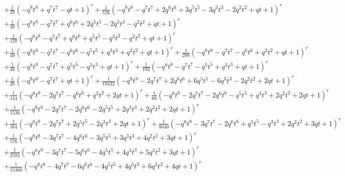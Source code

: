 \documentclass[11pt,english]{amsart}
\numberwithin{equation}{section}
\numberwithin{figure}{section}
\theoremstyle{plain}
\theoremstyle{plain}
\theoremstyle{definition}
\theoremstyle{remark}
\begin{document}
{\begin{align*}
& + \frac{1}{28}  {\left(-q^{8} t^{8} + q^{7} t^{7} - q t + 1\right)}^{r} + \frac{1}{576}  {\left(-q^{8} t^{8} - q^{7} t^{7} + 2  q^{6} t^{6} + 3  q^{5} t^{5} - 3  q^{3} t^{3} - 2  q^{2} t^{2} + q t + 1\right)}^{r} \\
& + \frac{1}{48}  {\left(-q^{8} t^{8} - q^{7} t^{7} + q^{6} t^{6} + 2  q^{5} t^{5} - 2  q^{3} t^{3} - q^{2} t^{2} + q t + 1\right)}^{r} \\
& + \frac{1}{120}  {\left(-q^{8} t^{8} - q^{7} t^{7} + q^{6} t^{6} + q^{5} t^{5} - q^{3} t^{3} - q^{2} t^{2} + q t + 1\right)}^{r} \\
& + \frac{1}{40}  {\left(-q^{8} t^{8} - q^{7} t^{7} - q^{6} t^{6} - q^{5} t^{5} + q^{3} t^{3} + q^{2} t^{2} + q t + 1\right)}^{r} + \frac{1}{288}  {\left(-q^{8} t^{8} - q^{7} t^{7} - q^{6} t^{6} + q^{2} t^{2} + q t + 1\right)}^{r} \\
& + \frac{1}{48}  {\left(-q^{8} t^{8} - q^{7} t^{7} + q^{5} t^{5} - q^{3} t^{3} + q t + 1\right)}^{r} + \frac{1}{192}  {\left(-q^{8} t^{8} - q^{7} t^{7} - q^{5} t^{5} + q^{3} t^{3} + q t + 1\right)}^{r} \\
& + \frac{1}{28}  {\left(-q^{8} t^{8} - q^{7} t^{7} + q t + 1\right)}^{r} + \frac{1}{18432}  {\left(-q^{8} t^{8} - 2  q^{7} t^{7} + 2  q^{6} t^{6} + 6  q^{5} t^{5} - 6  q^{3} t^{3} - 2  q^{2} t^{2} + 2  q t + 1\right)}^{r} \\
& + \frac{1}{144}  {\left(-q^{8} t^{8} - 2  q^{7} t^{7} - q^{6} t^{6} + q^{2} t^{2} + 2  q t + 1\right)}^{r} + \frac{1}{60}  {\left(-q^{8} t^{8} - 2  q^{7} t^{7} - 2  q^{6} t^{6} - q^{5} t^{5} + q^{3} t^{3} + 2  q^{2} t^{2} + 2  q t + 1\right)}^{r} \\
& + \frac{1}{1536}  {\left(-q^{8} t^{8} - 2  q^{7} t^{7} - 2  q^{6} t^{6} - 2  q^{5} t^{5} + 2  q^{3} t^{3} + 2  q^{2} t^{2} + 2  q t + 1\right)}^{r} \\
& + \frac{1}{384}  {\left(-q^{8} t^{8} - 2  q^{7} t^{7} + 2  q^{5} t^{5} - 2  q^{3} t^{3} + 2  q t + 1\right)}^{r} + \frac{1}{8640}  {\left(-q^{8} t^{8} - 3  q^{7} t^{7} - 2  q^{6} t^{6} + q^{5} t^{5} - q^{3} t^{3} + 2  q^{2} t^{2} + 3  q t + 1\right)}^{r} \\
& + \frac{1}{576}  {\left(-q^{8} t^{8} - 3  q^{7} t^{7} - 4  q^{6} t^{6} - 3  q^{5} t^{5} + 3  q^{3} t^{3} + 4  q^{2} t^{2} + 3  q t + 1\right)}^{r} \\
& + \frac{1}{2592}  {\left(-q^{8} t^{8} - 3  q^{7} t^{7} - 5  q^{6} t^{6} - 4  q^{5} t^{5} + 4  q^{3} t^{3} + 5  q^{2} t^{2} + 3  q t + 1\right)}^{r} \\
& + \frac{1}{15360}  {\left(-q^{8} t^{8} - 4  q^{7} t^{7} - 6  q^{6} t^{6} - 4  q^{5} t^{5} + 4  q^{3} t^{3} + 6  q^{2} t^{2} + 4  q t + 1\right)}^{r} \\

\end{align*}}
\end{document}
